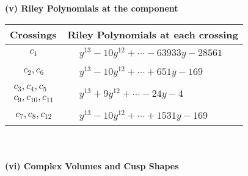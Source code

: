 \documentclass[1p]{elsarticle_modified}
\theoremstyle{definition}
\begin{document}
\newpage\renewcommand{\arraystretch}{1}
\flushleft \textbf{(v) Riley Polynomials at the component}\newline \\
\begin{tabular}{m{50pt}|m{274pt}}
Crossings & \hspace{64pt}Riley Polynomials at each crossing \\
\hline $$\begin{aligned}c_{1}\end{aligned}$$&$\begin{aligned}
&y^{13}-10 y^{12}+\cdots-63933 y-28561
\end{aligned}$\\
\hline $$\begin{aligned}c_{2},c_{6}\end{aligned}$$&$\begin{aligned}
&y^{13}-10 y^{12}+\cdots+651 y-169
\end{aligned}$\\
\hline $$\begin{aligned}c_{3},c_{4},c_{5}\\c_{9},c_{10},c_{11}\end{aligned}$$&$\begin{aligned}
&y^{13}+9 y^{12}+\cdots-24 y-4
\end{aligned}$\\
\hline $$\begin{aligned}c_{7},c_{8},c_{12}\end{aligned}$$&$\begin{aligned}
&y^{13}-10 y^{12}+\cdots+1531 y-169
\end{aligned}$\\
\hline
\end{tabular}\\~\\
\newpage\flushleft \textbf{(vi) Complex Volumes and Cusp Shapes}
\end{document}
